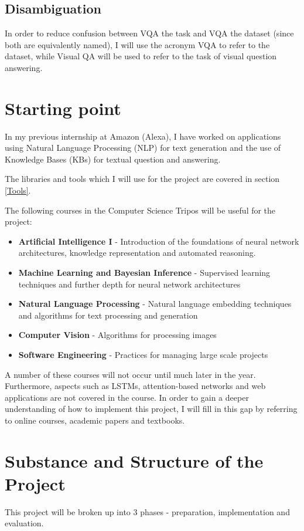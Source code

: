 \documentclass[12pt,a4paper,twoside]{article}
\begin{document}
\subsection{Disambiguation}
In order to reduce confusion between VQA the task and VQA the dataset (since both are equivalently named), I will use the acronym VQA to refer to the dataset, while Visual QA will be used to refer to the task of visual question answering.

\section{Starting point}
In my previous internship at Amazon (Alexa), I have worked on applications using Natural Language Processing (NLP) for text generation and the use of Knowledge Bases (KBs) for textual question and answering.

The libraries and tools which I will use for the project are covered in section \ref{Tools}.

\newpage

The following courses in the Computer Science Tripos will be useful for the project:
\begin{itemize}
	\item\textbf{Artificial Intelligence I} - Introduction of the foundations of neural network architectures, knowledge representation and automated reasoning.
	\item\textbf{Machine Learning and Bayesian Inference} - Supervised learning techniques and further depth for neural network architectures
	\item\textbf{Natural Language Processing} - Natural language embedding techniques and algorithms for text processing and generation 
	\item\textbf{Computer Vision} - Algorithms for processing images
	\item\textbf{Software Engineering} - Practices for managing large scale projects
\end{itemize}

A number of these courses will not occur until much later in the year. Furthermore, aspects such as LSTMs, attention-based networks and web applications are not covered in the course. In order to gain a deeper understanding of how to implement this project, I will fill in this gap by referring to online courses, academic papers and textbooks.

\section{Substance and Structure of the Project}
This project will be broken up into 3 phases - preparation, implementation and evaluation.
\end{document}
